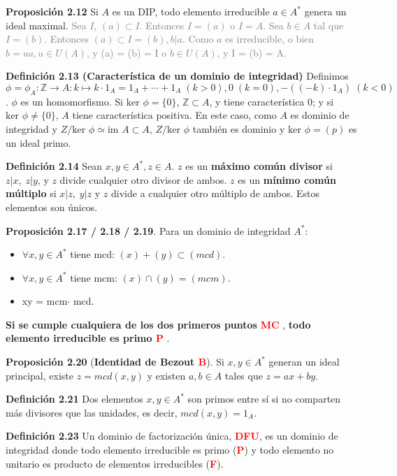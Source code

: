 \documentclass[a4paper, 11pt]{extarticle}
\newcommand{\propo}[1]{\textcolor{rojo}{\textbf{Proposición #1}}}
\newcommand{\defi}[1]{\textcolor{azul}{\textbf{Definición #1}}}
\begin{document}
\propo{2.12} Si \(A\) es un DIP, todo elemento irreducible \(a \in A^*\)
genera un ideal maximal. 
\textcolor{gray}{\footnotesize Sea \( I  \), \( (a) \subset I  \). Entonces \( I = (a) \) o 
\( I = A \). Sea \( b \in A \) tal que \( I = (b) \). Entonces \( (a) \subset I = (b), b | a \). 
Como \( a \) es irreducible, o bien \( b = ua, u \in U(A) \), y (a) = (b) = I \) o \( b \in U(A) \), y I = (b) = A.}

\defi{2.13 (Característica de un dominio de integridad)} Definimos \(\phi =
\phi_A: \mathbb{Z} \rightarrow A: k \mapsto k\cdot 1_A = 1_A + \cdots + 1_A\; (k >
0), 0\; (k = 0), -((-k) \cdot 1_A)\; (k < 0)\). \(\phi\) es un homomorfismo.
Si \(\text{ker }\phi = \{ 0 \}\), \(\mathbb{Z} \subset A\), y tiene
característica 0; y si \(\text{ker }\phi \neq \{ 0 \}\), \(A\) tiene
característica positiva. En este caso, como \(A\) es dominio de integridad y
\(Z/\text{ker }\phi \simeq \text{im } A \subset A\), \(Z/\text{ker } \phi\)
también es dominio y \(\text{ker }\phi = (p)\) es un ideal primo.

\defi{2.14} Sean \(x,y \in A^*, z \in A\). \(z\) es un \textbf{máximo común divisor}
si \(z|x, \; z|y\), y \(z\) divide cualquier otro divisor de ambos. 
\(z\) es un \textbf{mínimo común múltiplo} si \(x|z, \; y|z\) y \(z\) divide a
cualquier otro múltiplo de ambos. Estos elementos son únicos.

\propo{2.17 / 2.18 / 2.19}. Para un dominio de integridad \(A^*\): \vspace{-1em}
\begin{itemize}
\item \(\forall x,y \in A^*\) tiene mcd: \((x) + (y) \subset (mcd)\).
\item \(\forall x,y \in A^*\) tiene mcm: \((x) \cap (y) = (mcm)\).
\item xy = mcm\(\cdot\) mcd.
\end{itemize}
\textbf{Si se cumple cualquiera de los dos primeros puntos} \textbf{\textcolor{red}{MC}} , 
\textbf{todo elemento irreducible es primo \textcolor{red}{P}} . 

\propo{2.20} (\textbf{Identidad de Bezout \textcolor{red}{B}}). Si \(x,y \in A^*\) 
generan un ideal principal, existe \(z = mcd(x,y)\) y existen \(a,b \in A\) 
tales que \(z = ax + by\).

\defi{2.21} Dos elementos \(x,y \in A^*\) son primos entre sí si no comparten
más divisores que las unidades, es decir, \(mcd(x,y) = 1_A\).

\defi{2.23} Un dominio de factorización única, \textbf{\textcolor{red}{DFU}}, es un
dominio de integridad donde todo elemento irreducible es primo
(\textbf{\textcolor{red}{P}}) y todo elemento no unitario es producto de elementos
irreducibles (\textbf{\textcolor{red}{F}}).
\end{document}
